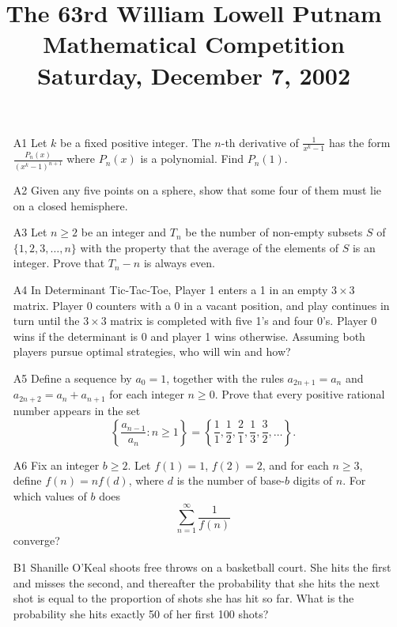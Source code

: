 \documentclass[amssymb,twocolumn,pra,10pt,aps]{revtex4-1}
\begin{document}
\title{The 63rd William Lowell Putnam Mathematical Competition \\
    Saturday, December 7, 2002}
\maketitle

\begin{itemize}
\item[A1]
Let $k$ be a fixed positive integer. The $n$-th derivative of
$\frac{1}{x^k - 1}$ has the form $\frac{P_n(x)}{(x^k - 1)^{n+1}}$
where $P_n(x)$ is a polynomial. Find $P_n(1)$.

\item[A2]
Given any five points on a sphere, show that some four of them
must lie on a closed hemisphere.

\item[A3]
Let $n \geq 2$ be an integer and $T_n$ be the number of non-empty
subsets $S$ of $\{1, 2, 3, \dots, n\}$ with the property that the
average of the elements of $S$ is an integer. Prove that
$T_n - n$ is always even.

\item[A4]
In Determinant Tic-Tac-Toe, Player 1 enters a 1 in an empty
$3 \times 3$ matrix. Player 0 counters with a 0 in a vacant position,
and play continues in turn until the $3 \times 3$ matrix is
completed with five 1's and four 0's. Player 0 wins if the
determinant is 0 and player 1 wins otherwise. Assuming both
players pursue optimal strategies, who will win and how?

\item[A5]
Define a sequence by $a_0=1$, together with the rules
$a_{2n+1} = a_n$ and $a_{2n+2} = a_n + a_{n+1}$ for each
integer $n \geq 0$. Prove that every positive rational number
appears in the set
\[
\left\{ \frac{a_{n-1}}{a_n}: n \geq 1 \right\} =
\left\{ \frac{1}{1}, \frac{1}{2}, \frac{2}{1}, \frac{1}{3},
\frac{3}{2}, \dots \right\}.
\]

\item[A6]
Fix an integer $b \geq 2$. Let $f(1) = 1$, $f(2) = 2$, and for each
$n \geq 3$, define $f(n) = n f(d)$, where $d$ is the number of
base-$b$ digits of $n$. For which values of $b$ does
\[
\sum_{n=1}^\infty \frac{1}{f(n)}
\]
converge?

\item[B1]
Shanille O'Keal shoots free throws on a basketball court. She hits
the first and misses the second, and thereafter the probability that
she hits the next shot is equal to the proportion of shots she
has hit so far. What is the probability she hits exactly 50 of
her first 100 shots?


\end{itemize}
\end{document}
